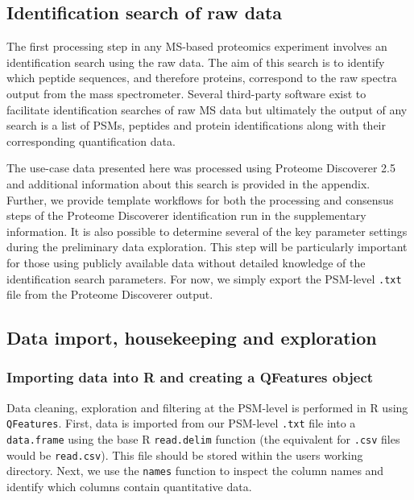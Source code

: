\documentclass[9pt,a4paper,]{extarticle}
\begin{document}
\subsection{Identification search of raw data}\label{identification-search-of-raw-data}

The first processing step in any MS-based proteomics experiment involves an
identification search using the raw data. The aim of this search is to identify
which peptide sequences, and therefore proteins, correspond to the raw spectra
output from the mass spectrometer. Several third-party software exist to
facilitate identification searches of raw MS data but ultimately the output of
any search is a list of PSMs, peptides and protein identifications along with
their corresponding quantification data.

The use-case data presented here was processed using Proteome Discoverer 2.5 and
additional information about this search is provided in the appendix. Further,
we provide template workflows for both the processing and consensus steps of the
Proteome Discoverer identification run in the supplementary information. It is
also possible to determine several of the key parameter settings during the
preliminary data exploration. This step will be particularly important for those
using publicly available data without detailed knowledge of the identification
search parameters. For now, we simply export the PSM-level \texttt{.txt} file from the
Proteome Discoverer output.

\subsection{Data import, housekeeping and exploration}\label{data-import-housekeeping-and-exploration}

\subsubsection{Importing data into R and creating a QFeatures object}\label{importing-data-into-r-and-creating-a-qfeatures-object}

Data cleaning, exploration and filtering at the PSM-level is performed in R
using \texttt{QFeatures}. First, data is imported from our PSM-level \texttt{.txt} file into a
\texttt{data.frame} using the base R \texttt{read.delim} function (the equivalent for \texttt{.csv}
files would be \texttt{read.csv}). This file should be stored within the users working
directory. Next, we use the \texttt{names} function to inspect the column names and
identify which columns contain quantitative data.
\end{document}
